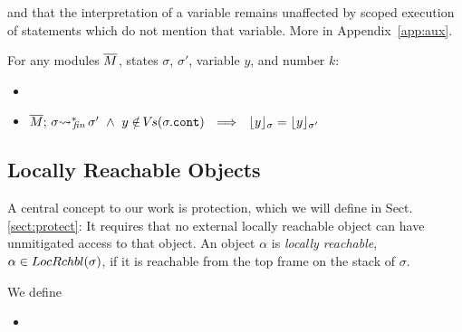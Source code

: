 and that 
the interpretation of a variable remains unaffected by
scoped execution of statements  which do not mention that variable. %
More  in Appendix~\ref{app:aux}.

\begin{lemma}
\label{l:var:unaffect}
For any modules $\overline{M}$, states $\sigma$, $\sigma'$,  variable $y$, and number $k$:
\begin{itemize}
\item
\label{carInFrame}
\item
$\leadstoBoundedStarFin {\Mtwo}  {\sigma}  {\sigma'} \ \wedge \ y\notin \vs(\sigma.\prg{cont}) \ \ \Longrightarrow \ \  \interpret \sigma y =  \interpret {\sigma'} y$
\end{itemize}

\end{lemma}


  \subsection{{{Locally} Reachable  Objects}}

 {A central concept to our work is %
protection, which we will define in   Sect. \ref{sect:protect}: It requires that no external locally reachable object  
can have unmitigated access to that object.}
An object $\alpha$ is  \emph{locally reachable}, $\alpha \in  LocRchbl(\sigma) $, if it is reachable from the top frame on the stack of $\sigma$.
 
\begin{definition} We define 
\begin{itemize}
\item
{}
\end{itemize}
\end{definition}

